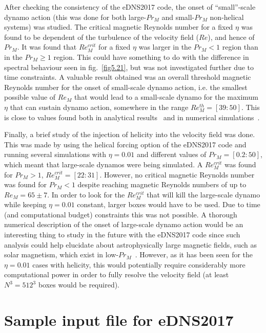 \documentclass[12pt,a4paper]{report}
\begin{document}
After checking the consistency of the eDNS2017 code, the onset of ``small''-scale dynamo action (this was done for both large-$Pr_M$ and small-$Pr_M$ non-helical systems) was studied. The critical magnetic Reynolds number for a fixed $\eta$ was found to be dependent of the turbulence of the velocity field ($Re$), and hence of $Pr_M$. It was found that $Re_M^{crit}$ for a fixed $\eta$ was larger in the $Pr_M<1$ region than in the $Pr_M\geq1$ region. This could have something to do with the difference in spectral behaviour seen in fig.~\ref{fig5.21}, but was not investigated further due to time constraints. A valuable result obtained was an overall threshold magnetic Reynolds number for the onset of small-scale dynamo action, i.e. the smallest possible value of $Re_M$ that would lead to a small-scale dynamo for the maximum $\eta$ that can sustain dynamo action, somewhere in the range $Re_M^{th}=[39:50]$. This is close to values found both in analytical results~\cite{kazantsev1968enhancement} and in numerical simulations~\cite{haugen2004simulations}.

Finally, a brief study of the injection of helicity into the velocity field was done. This was made by using the helical forcing option of the eDNS2017 code and running several simulations with $\eta=0.01$ and different values of $Pr_M=[0.2:50]$, which meant that large-scale dynamos were being simulated. A $Re_M^{crit}$ was found for $Pr_M>1$, $Re_M^{crit}=[22:31]$. However, no critical magnetic Reynolds number was found for $Pr_M<1$ despite reaching magnetic Reynolds numbers of up to $Re_M=65\pm7$. In order to look for the $Re_M^{crit}$ that will kill the large-scale dynamo while keeping $\eta=0.01$ constant, larger boxes would have to be used. Due to time (and computational budget) constraints this was not possible. A thorough numerical description of the onset of large-scale dynamo action would be an interesting thing to study in the future with the eDNS2017 code since such analysis could help elucidate about astrophysically large magnetic fields, such as solar magnetism, which exist in low-$Pr_M$~\cite{schekochihin2007fluctuation}. However, as it has been seen for the $\eta=0.01$ cases with helicity, this would potentially require considerably more computational power in order to fully resolve the velocity field (at least $N^3=512^3$ boxes would be required).

\appendix
\chapter{Sample input file for eDNS2017}
\label{apx1}
\end{document}

